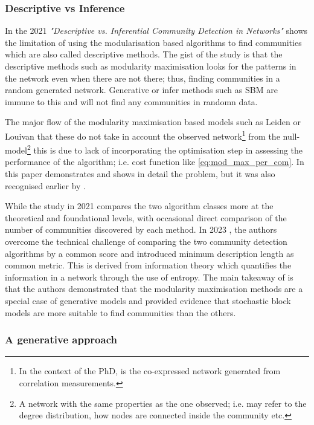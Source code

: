 \subsubsection{Descriptive vs Inference} \label{s:lit:descriptive_inference}

In the 2021 \textit{"Descriptive vs. Inferential Community Detection in Networks"} \citet{Peixoto2021-jx} shows the limitation of using the modularisation based algorithms to find communities which are also called descriptive methods. The gist of the study is that the descriptive methods such as modularity maximisation looks for the patterns in the network even when there are not there; thus, finding communities in a random generated network. Generative or infer methods such as SBM are immune to this and will not find any communities in randomn data.

The major flow of the modularity maximisation based models such as Leiden or Louivan that these do not take in account the observed network\footnote{In the context of the PhD, is the co-expressed network generated from correlation measurements.} from the null-model\footnote{A network with the same properties as the one observed; i.e. may refer to the degree distribution, how nodes are connected inside the community etc.} this is due to lack of incorporating the optimisation step in assessing the performance of the algorithm; i.e. cost function like \cref{eq:mod_max_per_com}. In this paper \citet{Peixoto2021-jx} demonstrates and shows in detail the problem, but it was also recognised earlier by \citet{Guimera2004-gv}.

While the study in 2021 \citet{Peixoto2021-jx} compares the two algorithm classes more at the theoretical and foundational levels, with occasional direct comparison of the number of communities discovered by each method. In 2023 \citet{Peixoto2023-rt}, the authors overcome the technical challenge of comparing the two community detection algorithms by a common score and introduced minimum description length as common metric. This is derived from information theory which quantifies the information in a network through the use of entropy. The main takeaway of \citet{Peixoto2023-rt} is that the authors demonstrated that the modularity maximisation methods are a special case of generative models and provided evidence that stochastic block models are more suitable to find communities than the others.

\subsubsection{A generative approach} \label{s:lit:sbm}


